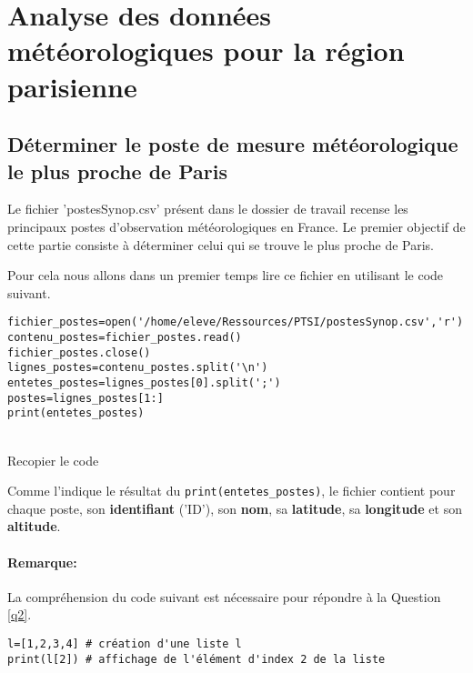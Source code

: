 \section{Analyse des données météorologiques pour la région parisienne}

\subsection{Déterminer le poste de mesure météorologique le plus proche de Paris}

Le fichier 'postesSynop.csv' présent dans le dossier de travail recense les principaux postes d'observation météorologiques en France. Le premier objectif de cette partie consiste à déterminer celui qui se trouve le plus proche de Paris.

Pour cela nous allons dans un premier temps lire ce fichier en utilisant le code suivant.

\begin{verbatim}
fichier_postes=open('/home/eleve/Ressources/PTSI/postesSynop.csv','r')
contenu_postes=fichier_postes.read()
fichier_postes.close()
lignes_postes=contenu_postes.split('\n')
entetes_postes=lignes_postes[0].split(';')
postes=lignes_postes[1:]
print(entetes_postes)
\end{verbatim}


\begin{solution}~\ \\
Recopier le code
\end{solution}

Comme l'indique le résultat du \verb?print(entetes_postes)?, le fichier contient pour chaque poste, son \textbf{identifiant} ('ID'), son \textbf{nom}, sa \textbf{latitude}, sa \textbf{longitude} et son \textbf{altitude}.

\paragraph{Remarque:}
La compréhension du code suivant est nécessaire pour répondre à la Question \ref{q2}.
\begin{verbatim}
l=[1,2,3,4] # création d'une liste l
print(l[2]) # affichage de l'élément d'index 2 de la liste
\end{verbatim}


